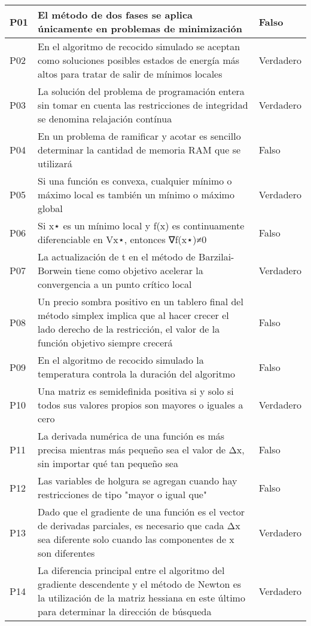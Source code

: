 \documentclass{article}
\begin{document}
\begin{longtable}{|>{\centering\arraybackslash}p{1.5cm}|>{\raggedright\arraybackslash}p{14cm}|>{\centering\arraybackslash}p{2cm}|}
P01 & El método de dos fases se aplica únicamente en problemas de minimización & Falso \\
\hline
P02 & En el algoritmo de recocido simulado se aceptan como soluciones posibles estados de energía más altos para tratar de salir de mínimos locales & Verdadero \\
\hline
P03 & La solución del problema de programación entera sin tomar en cuenta las restricciones de integridad se denomina relajación contínua & Verdadero \\
\hline
P04 & En un problema de ramificar y acotar es sencillo determinar la cantidad de memoria RAM que se utilizará & Falso \\
\hline
P05 & Si una función es convexa, cualquier mínimo o máximo local es también un mínimo o máximo global & Verdadero \\
\hline
P06 & Si x⋆ es un mínimo local y f(x) es continuamente diferenciable en Vx⋆, entonces ∇f(x⋆)≠0 & Falso \\
\hline
P07 & La actualización de t en el método de Barzilai-Borwein tiene como objetivo acelerar la convergencia a un punto crítico local & Verdadero \\
\hline
P08 & Un precio sombra positivo en un tablero final del método simplex implica que al hacer crecer el lado derecho de la restricción, el valor de la función objetivo siempre crecerá & Falso \\
\hline
P09 & En el algoritmo de recocido simulado la temperatura controla la duración del algoritmo & Falso \\
\hline
P10 & Una matriz es semidefinida positiva si y solo si todos sus valores propios son mayores o iguales a cero & Verdadero \\
\hline
P11 & La derivada numérica de una función es más precisa mientras más pequeño sea el valor de Δx, sin importar qué tan pequeño sea & Falso \\
\hline
P12 & Las variables de holgura se agregan cuando hay restricciones de tipo "mayor o igual que" & Falso \\
\hline
P13 & Dado que el gradiente de una función es el vector de derivadas parciales, es necesario que cada Δx sea diferente solo cuando las componentes de x son diferentes & Verdadero \\
\hline
P14 & La diferencia principal entre el algoritmo del gradiente descendente y el método de Newton es la utilización de la matriz hessiana en este último para determinar la dirección de búsqueda & Verdadero \\

\end{longtable}
\end{document}
